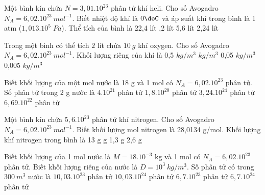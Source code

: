 \begin{vidu}%
	Một bình kín chứa $N= 3,01.10^{23}$ phân tử khí heli. Cho số Avogadro $N_A = 6,02.10^{23}\ mol^{-1}$. Biết nhiệt độ khí là $0\doC$ và áp suất khí trong bình là 1 atm ($1,013.10^5\;Pa$). Thể tích của bình là
	\choice
	{22,4 lít}
	{,2 lít}
	{5,6 lít}
	{2,24 lít}
\end{vidu}
\begin{vidu}%
	Trong một bình có thể tích $2$ lít chứa $10\ g$ khí oxygen. Cho số Avogadro $N_A = 6,02.10^{23}\ mol^{-1}$. Khối lượng riêng của khí là
	\choice
	{0,5 $kg/m^3$}
	{ $kg/m^3$}
	{0,05 $kg/m^3$}
	{0,005 $kg/m^3$}
\end{vidu}
\begin{vidu} %
	Biết khối lượng của một mol nước là 18 g và 1 mol có $N_A= 6,02. 10^{23}$ phân tử. Số phân tử trong 2 g nước là
	\choice
	{$4. 10^{21}$ phân tử}
	{$1,8. 10^{20}$ phân tử}
	{$3,24. 10^{24}$ phân tử}
	{\True $6,69. 10^{22}$ phân tử}
\end{vidu}

\begin{vidu}%
	Một bình kín chứa $5,6.10^{23}$ phân tử khí nitrogen. Cho số Avogadro $N_A = 6,02.10^{23}\ mol^{-1}$. Biết khối lượng mol nitrogen là 28,0134 g/mol. Khối lượng khí nitrogen trong bình là
	\choice
	{13 g}
	{ g}
	{1,3 g}
	{2,6 g}
\end{vidu}
\begin{vidu} %
	Biết khối lượng của 1 mol nước là $M = 18. 10^{- 3}$ kg và 1 mol có $N_A = 6, 02.10^{23}$ phân tử. Biết khối lượng riêng của nước là $D=10^3\ kg/m^3$. Số phân tử có trong $300\ m^3$ nước là
	\choice
	{$10, 03.10^{23}$ phân tử}
	{\True $10, 03.10^{24}$ phân tử}
	{$6, 7.10^{23}$ phân tử}
	{$6,7. 10^{24}$ phân tử}
	
\end{vidu}